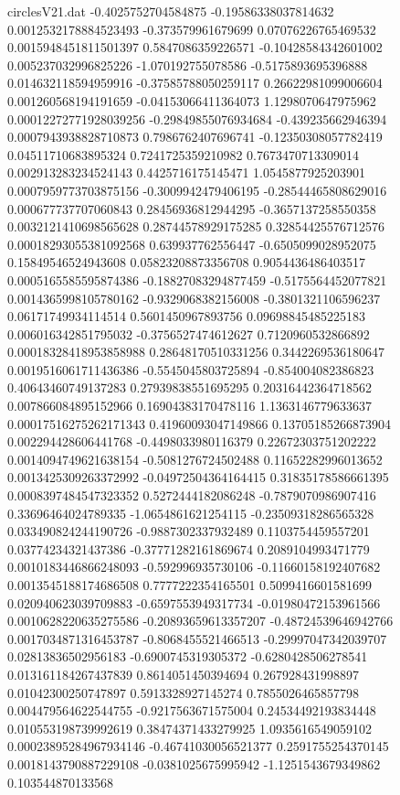 \begin{filecontents}{circlesV21.dat}
-0.4025752704584875	-0.19586338037814632	0.0012532178884523493
-0.373579961679699	0.07076226765469532	0.0015948451811501397
0.5847086359226571	-0.10428584342601002	0.005237032996825226
-1.070192755078586	-0.5175893695396888	0.014632118594959916
-0.37585788050259117	0.26622981099006604	0.001260568194191659
-0.04153066411364073	1.1298070647975962	0.00012272771928039256
-0.29849855076934684	-0.439235662946394	0.0007943938828710873
0.7986762407696741	-0.12350308057782419	0.04511710683895324
0.7241725359210982	0.7673470713309014	0.002913283234524143
0.4425716175145471	1.0545877925203901	0.0007959773703875156
-0.3009942479406195	-0.28544465808629016	0.000677737707060843
0.28456936812944295	-0.3657137258550358	0.0032121410698565628
0.28744578929175285	0.32854425576712576	0.00018293055381092568
0.639937762556447	-0.6505099028952075	0.15849546524943608
0.05823208873356708	0.9054436486403517	0.0005165585595874386
-0.18827083294877459	-0.5175564452077821	0.0014365998105780162
-0.9329068382156008	-0.3801321106596237	0.06171749934114514
0.5601450967893756	0.09698845485225183	0.006016342851795032
-0.3756527474612627	0.7120960532866892	0.00018328418953858988
0.28648170510331256	0.3442269536180647	0.0019516061711436386
-0.5545045803725894	-0.854004082386823	0.40643460749137283
0.27939838551695295	0.20316442364718562	0.007866084895152966
0.16904383170478116	1.1363146779633637	0.00017516275262171343
0.41960093047149866	0.13705185266873904	0.002294428606441768
-0.4498033980116379	0.22672303751202222	0.0014094749621638154
-0.5081276724502488	0.11652282996013652	0.0013425309263372992
-0.04972504364164415	0.31835178586661395	0.0008397484547323352
0.5272444182086248	-0.7879070986907416	0.33696464024789335
-1.0654861621254115	-0.23509318286565328	0.033490824244190726
-0.9887302337932489	0.1103754459557201	0.03774234321437386
-0.37771282161869674	0.2089104993471779	0.0010183446866248093
-0.592996935730106	-0.11660158192407682	0.0013545188174686508
0.7777222354165501	0.5099416601581699	0.020940623039709883
-0.6597553949317734	-0.01980472153961566	0.0010628220635275586
-0.20893659613357207	-0.48724539646942766	0.0017034871316453787
-0.8068455521466513	-0.29997047342039707	0.02813836502956183
-0.6900745319305372	-0.6280428506278541	0.013161184267437839
0.8614051450394694	0.267928431998897	0.01042300250747897
0.5913328927145274	0.7855026465857798	0.004479564622544755
-0.9217563671575004	0.24534492193834448	0.010553198739992619
0.38474371433279925	1.0935616549059102	0.00023895284967934146
-0.46741030056521377	0.2591755254370145	0.0018143790887229108
-0.0381025675995942	-1.1251543679349862	0.103544870133568

\end{filecontents}
